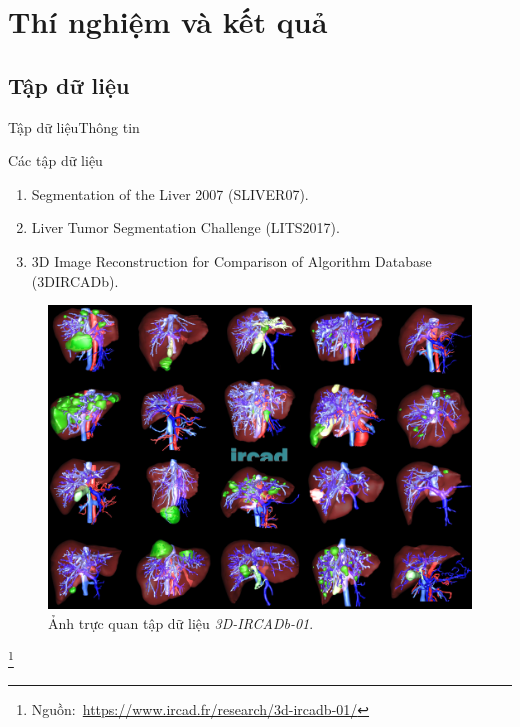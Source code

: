 \documentclass[
	10pt,                %
	aspectratio=169,     %
]{beamer}
\newcommand\footnotesource[1]{					%
	\vspace{-10mm}\let\thefootnote\relax\footnote{\hspace{-3mm}\tiny Nguồn:~#1}
}
\begin{document}
\section{Thí nghiệm và kết quả}
 \subsection{Tập dữ liệu}
	\begin{frame}{Tập dữ liệu}{Thông tin}
		\begin{block}{Các tập dữ liệu}
			\begin{enumerate}
				\item Segmentation of the Liver 2007 (SLIVER07).
				\item Liver Tumor Segmentation Challenge (LITS2017).
				\item 3D Image Reconstruction for Comparison of Algorithm Database (3DIRCADb).
			\end{enumerate}
		\end{block}
		\vspace{-2mm}
		\begin{figure}[h!]
			\includegraphics[height=.4\textheight]{figures/dataset/ircad_dataset}
			\vspace{-2mm}
			\caption{Ảnh trực quan tập dữ liệu \textit{3D-IRCADb-01}.}
		\end{figure}
		\footnotesource{\url{https://www.ircad.fr/research/3d-ircadb-01/}}
	\end{frame}
	
\end{document}
